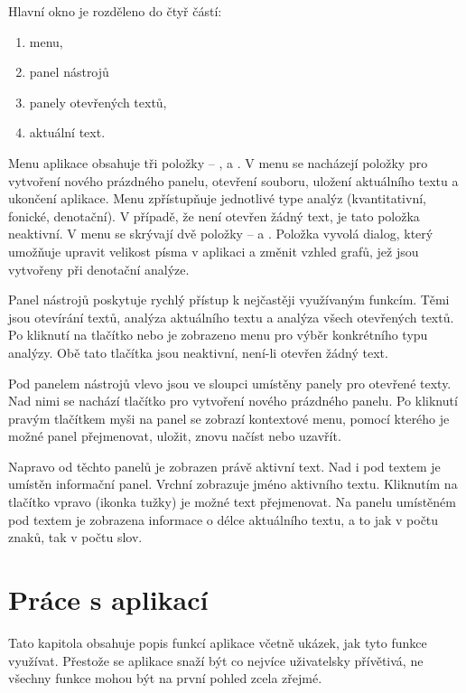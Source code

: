 \documentclass[dp.tex]{subfiles}
\begin{document}
Hlavní okno je rozděleno do čtyř částí:

\begin{enumerate}
	\item menu,
	\item panel nástrojů
	\item panely otevřených textů,
	\item aktuální text.
\end{enumerate}

Menu aplikace obsahuje tři položky -- ,  a . V menu  se nacházejí položky pro vytvoření nového prázdného panelu, otevření souboru, uložení aktuálního textu a ukončení aplikace. Menu  zpřístupňuje jednotlivé type analýz (kvantitativní, fonické, denotační). V případě, že není otevřen žádný text, je tato položka neaktivní. V menu  se skrývají dvě položky --  a . Položka  vyvolá dialog, který umožňuje upravit velikost písma v aplikaci a změnit vzhled grafů, jež jsou vytvořeny při denotační analýze.

Panel nástrojů poskytuje rychlý přístup k nejčastěji využívaným funkcím. Těmi jsou otevírání textů, analýza aktuálního textu a analýza všech otevřených textů. Po kliknutí na tlačítko  nebo  je zobrazeno menu pro výběr konkrétního typu analýzy. Obě tato tlačítka jsou neaktivní, není-li otevřen žádný text.

Pod panelem nástrojů vlevo jsou ve sloupci umístěny panely pro otevřené texty. Nad nimi se nachází tlačítko pro vytvoření nového prázdného panelu. Po kliknutí pravým tlačítkem myši na panel se zobrazí kontextové menu, pomocí kterého je možné panel přejmenovat, uložit, znovu načíst nebo uzavřít.

Napravo od těchto panelů je zobrazen právě aktivní text. Nad i pod textem je umístěn informační panel. Vrchní zobrazuje jméno aktivního textu. Kliknutím na tlačítko vpravo (ikonka tužky) je možné text přejmenovat. Na panelu umístěném pod textem je zobrazena informace o délce aktuálního textu, a to jak v počtu znaků, tak v počtu slov.

\section{Práce s aplikací}

Tato kapitola obsahuje popis funkcí aplikace včetně ukázek, jak tyto funkce využívat. Přestože se aplikace snaží být co nejvíce uživatelsky přívětivá, ne všechny funkce mohou být na první pohled zcela zřejmé.
\end{document}
